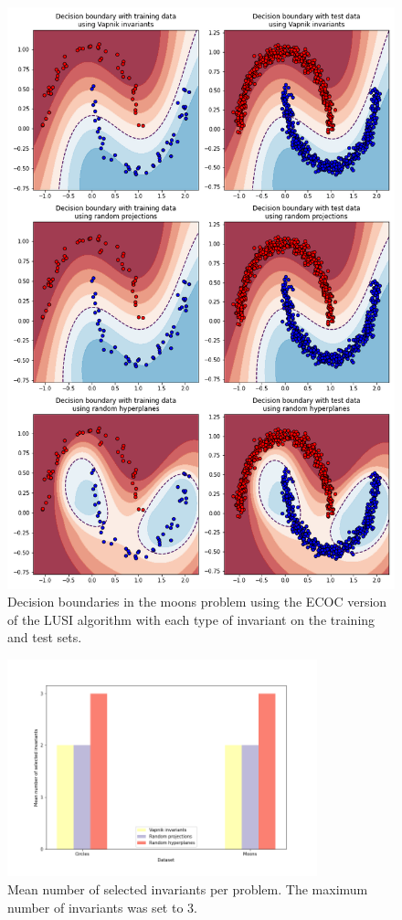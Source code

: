 \begin{figure}[H]
    \centering
    \includegraphics[width=\textwidth]{thesis/Figures/moons_decision_boundaries_ecoc.png}
    \caption{Decision boundaries in the moons problem using the ECOC version of the LUSI algorithm with each type
    of invariant on the training and test sets.}
    \label{fig:moons_decision_boundary_ecoc}
\end{figure}

\begin{figure}[H]
    \centering
    \includegraphics[width=0.8\textwidth]{thesis/Figures/num_selected_invariants.png}
    \caption{Mean number of selected invariants per problem. The maximum number of invariants was set to 3.}
    \label{fig:toys_small_num_selected_invariants}
\end{figure}

